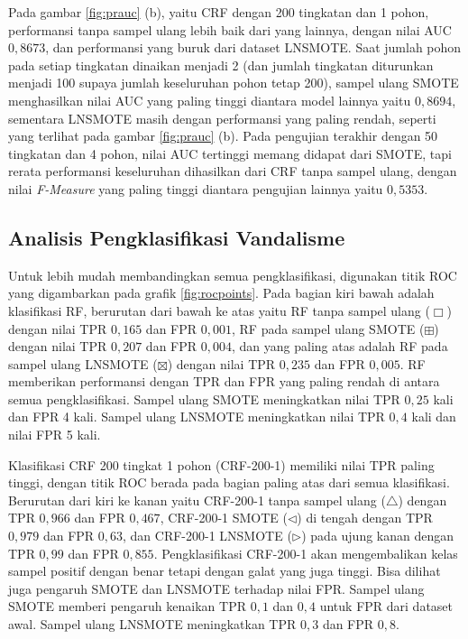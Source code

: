 Pada gambar \ref{fig:prauc} (b), yaitu CRF dengan 200 tingkatan dan 1 pohon,
performansi tanpa sampel ulang lebih baik dari yang lainnya, dengan nilai AUC
$0,8673$, dan performansi yang buruk dari dataset LNSMOTE.
Saat jumlah pohon pada setiap tingkatan dinaikan menjadi 2 (dan jumlah
tingkatan diturunkan menjadi 100 supaya jumlah keseluruhan pohon tetap 200),
sampel ulang SMOTE menghasilkan nilai AUC yang paling tinggi diantara
model lainnya yaitu $0,8694$, sementara LNSMOTE masih dengan performansi yang
paling rendah, seperti yang terlihat pada gambar \ref{fig:prauc} (b).
Pada pengujian terakhir dengan 50 tingkatan dan 4 pohon, nilai AUC tertinggi
memang didapat dari SMOTE, tapi rerata performansi keseluruhan dihasilkan dari
CRF tanpa sampel ulang, dengan nilai \textit{F-Measure} yang paling tinggi
diantara pengujian lainnya yaitu $0,5353$.



\subsection{Analisis Pengklasifikasi Vandalisme}



Untuk lebih mudah membandingkan semua pengklasifikasi, digunakan titik
ROC yang digambarkan pada grafik \ref{fig:rocpoints}.
Pada bagian kiri bawah adalah klasifikasi RF, berurutan dari bawah ke atas
yaitu RF tanpa sampel ulang ($\Box$) dengan nilai TPR $0,165$ dan FPR $0,001$,
RF pada sampel ulang SMOTE ($\boxplus$) dengan nilai TPR $0,207$ dan FPR
$0,004$, dan yang
paling atas adalah RF pada sampel ulang LNSMOTE ($\boxtimes$) dengan nilai TPR
$0,235$ dan FPR $0,005$.
RF memberikan performansi dengan TPR dan FPR yang paling rendah di antara semua
pengklasifikasi.
Sampel ulang SMOTE meningkatkan nilai TPR $0,25$ kali dan FPR 4 kali.
Sampel ulang LNSMOTE meningkatkan nilai TPR $0,4$ kali dan nilai FPR 5 kali.

Klasifikasi CRF 200 tingkat 1 pohon (CRF-200-1) memiliki nilai TPR paling
tinggi, dengan titik ROC berada pada bagian paling atas dari semua klasifikasi.
Berurutan dari kiri ke kanan yaitu CRF-200-1 tanpa sampel ulang ($\triangle$)
dengan TPR $0,966$ dan FPR $0,467$, CRF-200-1 SMOTE ($\triangleleft$) di tengah
dengan TPR $0,979$ dan FPR $0,63$, dan CRF-200-1 LNSMOTE ($\triangleright$)
pada ujung kanan dengan TPR $0,99$ dan FPR $0,855$.
Pengklasifikasi CRF-200-1 akan mengembalikan kelas sampel positif dengan benar
tetapi dengan galat yang juga tinggi.
Bisa dilihat juga pengaruh SMOTE dan LNSMOTE terhadap nilai FPR.
Sampel ulang SMOTE memberi pengaruh kenaikan TPR $0,1$ dan $0,4$ untuk FPR dari
dataset awal.
Sampel ulang LNSMOTE meningkatkan TPR $0,3$ dan FPR $0,8$.

